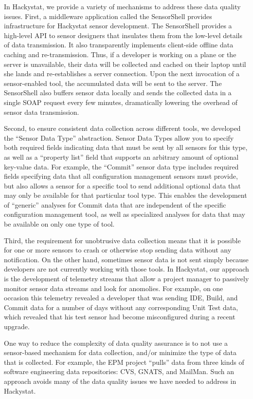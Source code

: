\documentclass[10pt,twocolumn]{article}
\begin{document}
In Hackystat, we provide a variety of mechanisms to address these
data quality issues.  First, a middleware application
called the SensorShell provides infrastructure for Hackystat sensor
development.  The SensorShell provides a high-level API to sensor designers
that insulates them from the low-level details of data transmission. It
also transparently implements client-side offline data caching and
re-transmission.  Thus, if a developer is working on a plane or the server
is unavailable, their data will be collected and cached on their laptop
until she lands and re-establishes a server connection.  Upon the next
invocation of a sensor-enabled tool, the accumulated data will be sent to
the server.  The SensorShell also buffers sensor data locally and sends the
collected data in a single SOAP request every few minutes, dramatically lowering
the overhead of sensor data transmission.

Second, to ensure consistent data collection across different tools, we
developed the ``Sensor Data Type'' abstraction.  Sensor Data Types allow
you to specify both required fields indicating data that must be sent by
all sensors for this type, as well as a ``property list'' field that
supports an arbitrary amount of optional key-value data.  For example, the
``Commit'' sensor data type includes required fields specifying data that
all configuration management sensors must provide, but also allows a sensor
for a specific tool to send additional optional data that may only be
available for that particular tool type. This enables the development of
``generic'' analyses for Commit data that are independent of the specific
configuration management tool, as well as specialized analyses for data
that may be available on only one type of tool.

Third, the requirement for unobtrusive data collection means that it is
possible for one or more sensors to crash or otherwise stop sending data
without any notification. On the other hand, sometimes sensor data is not
sent simply because developers are not currently working with those tools.
In Hackystat, our approach is the development of telemetry streams that
allow a project manager to passively monitor sensor data streams and look
for anomolies.  For example, on one occasion this telemetry revealed a
developer that was sending IDE, Build, and Commit data for a number of days
without any corresponding Unit Test data, which revealed that his test
sensor had become misconfigured during a recent upgrade.

One way to reduce the complexity of data quality assurance is to not use a
sensor-based mechanism for data collection, and/or minimize the type of
data that is collected. For example, the EPM project ``pulls'' data from
three kinds of software engineering data repositories: CVS, GNATS, and
MailMan.  Such an approach avoids many of the data quality issues we have
needed to address in Hackystat.
\end{document}

